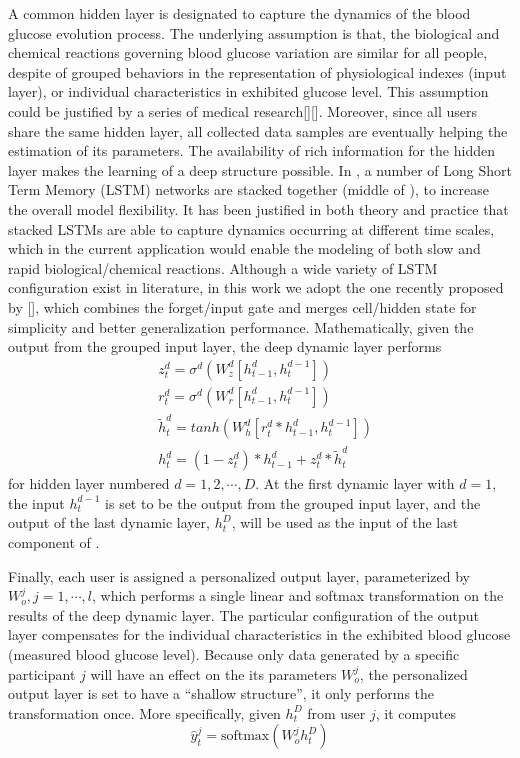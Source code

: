 A common hidden layer is designated to capture the dynamics of the blood glucose evolution process.
The underlying assumption is that, the biological and chemical reactions governing blood glucose variation are similar for all people, despite of grouped behaviors in the representation of physiological indexes (input layer), or individual characteristics in exhibited glucose level.
This assumption could be justified by a series of medical research[][].
Moreover, since all users share the same hidden layer, all collected data samples are eventually helping the estimation of its parameters.
The availability of rich information for the hidden layer makes the learning of a deep structure possible.
In \sysname, a number of Long Short Term Memory (LSTM) networks are stacked together (middle of ), to increase the overall model flexibility.
It has been justified in both theory and practice that stacked LSTMs are able to capture dynamics occurring at different time scales, which in the current application would enable the modeling of both slow and rapid biological/chemical reactions.
Although a wide variety of LSTM configuration exist in literature, in this work we adopt the one recently proposed by [], which combines the forget/input gate and merges cell/hidden state for simplicity and better generalization performance.
Mathematically, given the output from the grouped input layer, the deep dynamic layer performs
\begin{equation}
\begin{aligned}
&z^d_t = \sigma^d\left( W^d_z [h_{t-1}^d,h_t^{d-1}] \right) \\
&r^d_t = \sigma^d\left( W^d_r [h_{t-1}^d,h_t^{d-1}] \right) \\
&\tilde{h}_t^d = tanh\left( W^d_h [r_t^d*h_{t-1}^d,h_t^{d-1}] \right) \\
&h^d_t = (1-z_t^d)*h_{t-1}^d + z_t^d*\tilde{h}_t^d
\end{aligned}
\end{equation}
for hidden layer numbered $d = 1,2,\cdots,D$. At the first dynamic layer with $d=1$, the input $h_t^{d-1}$ is set to be the output from the grouped input layer, and the output of the last dynamic layer, $h^D_t$, will be used as the input of the last component of \modelname.

Finally, each user is assigned a personalized output layer, parameterized by $W_o^j, j=1,\cdots,l$, which performs a single linear and softmax transformation on the results of the deep dynamic layer.
The particular configuration of the output layer compensates for the individual characteristics in the exhibited blood glucose (\ie measured blood glucose level).
Because only data generated by a specific participant $j$ will have an effect on the its parameters $W_o^j$, the personalized output layer is set to have a ``shallow structure'', \ie it only performs the transformation once.
More specifically, given $h^D_t$ from user $j$, it computes
\begin{equation}
\hat{y}_t^j = \text{softmax} \left( W_o^j h^D_t \right)
\end{equation}

